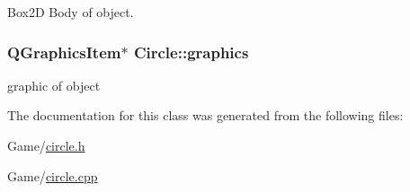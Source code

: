 Box2D Body of object. 

\subsubsection[{\texorpdfstring{graphics}{graphics}}]{\setlength{\rightskip}{0pt plus 5cm}Q\+Graphics\+Item$\ast$ Circle\+::graphics}\hypertarget{class_circle_adcb606946696832caca242eafcc8322a}{}\label{class_circle_adcb606946696832caca242eafcc8322a}


graphic of object 



The documentation for this class was generated from the following files\+:\begin{DoxyCompactItemize}
\item 
Game/\hyperlink{circle_8h}{circle.\+h}\item 
Game/\hyperlink{circle_8cpp}{circle.\+cpp}\end{DoxyCompactItemize}
